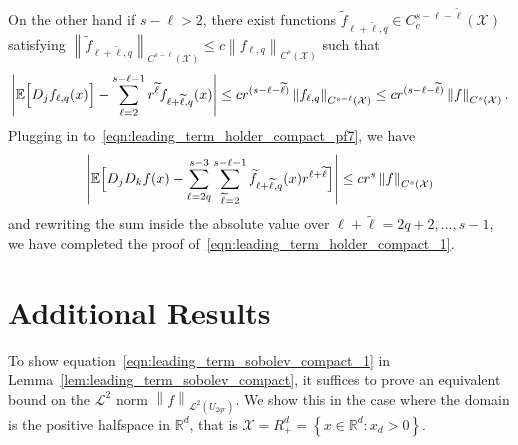 \documentclass{article}
\newcommand{\Reals}{\mathbb{R}}
\newcommand{\abs}[1]{\left \lvert #1 \right \rvert}
\newcommand{\norm}[1]{\left \lVert #1 \right \rVert}
\newcommand{\set}[1]{\left\{#1\right\}}
\newcommand{\1}{\mathbf{1}}
\newcommand{\Rd}{\Reals^d}
\newcommand{\Xset}{\mathcal{X}}
\newcommand{\Leb}{\mathcal{L}}
\newcommand{\Ebb}{\mathbb{E}}
\newcommand{\wt}[1]{\widetilde{#1}}
\theoremstyle{alden}
\theoremstyle{aldenthm}
\theoremstyle{definition}
\theoremstyle{remark}
\begin{document}
On the other hand if $s - \ell > 2$, there exist functions $\wt{f}_{\ell + \wt{\ell},q} \in C_c^{s - \ell - \wt{\ell}}(\Xset)$ satisfying $\norm{\wt{f}_{\ell + \wt{\ell},q}}_{C^{s - \ell}(\Xset)} \leq c \norm{f_{\ell,q}}_{C^s(\Xset)}$ such that
\begin{equation*}
\abs{\Ebb\Bigl[D_jf_{\ell,q}(x)\Bigr] - \sum_{\ell = 2}^{s - \ell  - 1} r^{\wt{\ell}} f_{\ell + \wt{\ell},q}(x)} \leq c r^{(s - \ell - \wt{\ell})} \norm{f_{\ell,q}}_{C^{s - \ell}(\Xset)} \leq c r^{(s - \ell - \wt{\ell})} \norm{f}_{C^{s}(\Xset)}.
\end{equation*}
Plugging in to~\eqref{eqn:leading_term_holder_compact_pf7}, we have
\begin{equation*}
\abs{\Ebb\Bigl[D_jD_kf(x) - \sum_{\ell = 2q}^{s - 3} \sum_{\wt{\ell} = 2}^{s - \ell - 1} \wt{f}_{\ell + \wt{\ell},q}(x) r^{\ell + \wt{\ell}}\Bigr]} \leq cr^s \norm{f}_{C^s(\Xset)}
\end{equation*}
and rewriting the sum inside the absolute value over $\ell + \wt{\ell} = 2q + 2,\ldots,s - 1$, we have completed the proof of~\eqref{eqn:leading_term_holder_compact_1}.


\section{Additional Results}

To show equation~\eqref{eqn:leading_term_sobolev_compact_1} in Lemma~\ref{lem:leading_term_sobolev_compact}, it suffices to prove an equivalent bound on the $\Leb^2$ norm $\norm{f}_{\Leb^2(U_{2qr})}$. We show this in the case where the domain is the positive halfspace in $\Rd$, that is $\Xset = R_+^d = \set{x \in \Reals^d: x_d > 0}$. 
\end{document}
